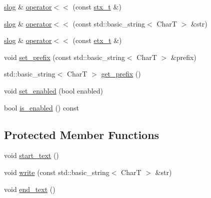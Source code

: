 \begin{DoxyCompactItemize}
\item 
\hyperlink{structdevfix_1_1base_1_1slog}{slog} \& \hyperlink{structdevfix_1_1base_1_1slog_aeb652e46530be0f44e33f88e17c5b8aa}{operator$<$$<$} (const \hyperlink{structdevfix_1_1base_1_1stx__t}{stx\+\_\+t} \&)
\item 
\hyperlink{structdevfix_1_1base_1_1slog}{slog} \& \hyperlink{structdevfix_1_1base_1_1slog_ae29889ec05f8930826cdf5ec1947a8d1}{operator$<$$<$} (const std\+::basic\+\_\+string$<$ CharT $>$ \&str)
\item 
\hyperlink{structdevfix_1_1base_1_1slog}{slog} \& \hyperlink{structdevfix_1_1base_1_1slog_a856573b0121225a0bd80c0f02645227c}{operator$<$$<$} (const \hyperlink{structdevfix_1_1base_1_1etx__t}{etx\+\_\+t} \&)
\item 
void \hyperlink{structdevfix_1_1base_1_1slog_a45b6fbc2f61c949d8cb6762629707ca3}{set\+\_\+prefix} (const std\+::basic\+\_\+string$<$ CharT $>$ \&prefix)
\item 
std\+::basic\+\_\+string$<$ CharT $>$ \hyperlink{structdevfix_1_1base_1_1slog_a692072f9ce3409f287c4f1f57fdf0e99}{get\+\_\+prefix} ()
\item 
void \hyperlink{structdevfix_1_1base_1_1slog_aec2d689cb06eb795bbd75c7df45df768}{set\+\_\+enabled} (bool enabled)
\item 
bool \hyperlink{structdevfix_1_1base_1_1slog_ae17c8415ef92091f6b7741919c4f6cdb}{is\+\_\+enabled} () const
\end{DoxyCompactItemize}
\subsection*{Protected Member Functions}
\begin{DoxyCompactItemize}
\item 
void \hyperlink{structdevfix_1_1base_1_1slog_a5e3a84ea7bcce1a17c5cf43398666f21}{start\+\_\+text} ()
\item 
void \hyperlink{structdevfix_1_1base_1_1slog_ab9939cb04b4d419ce97687d5823ee79e}{write} (const std\+::basic\+\_\+string$<$ CharT $>$ \&str)
\item 
void \hyperlink{structdevfix_1_1base_1_1slog_ac4610846d3f7b2dfa506ea6e1a9b1826}{end\+\_\+text} ()
\end{DoxyCompactItemize}

